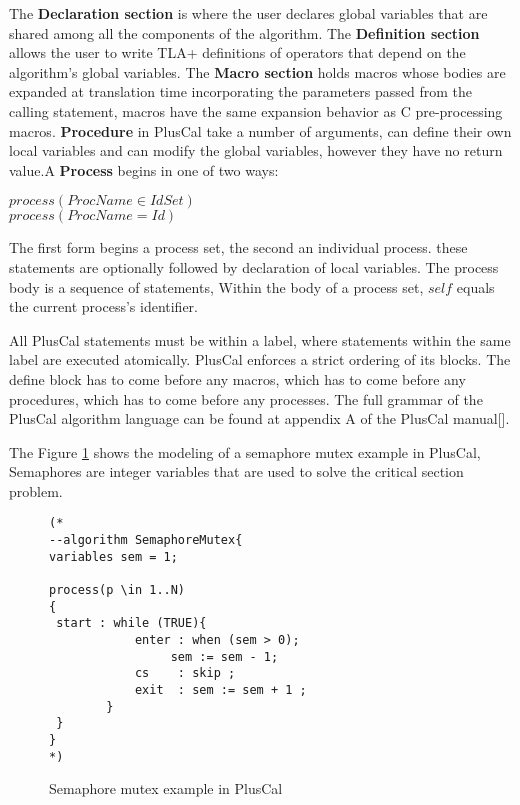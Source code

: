 \documentclass{thesul}
\begin{document}
The \textbf{Declaration section} is where the user declares global variables that are shared among all the components of the algorithm. The \textbf{Definition section} allows the user to write TLA+ definitions of operators that depend on the algorithm's global variables.
The \textbf{Macro section} holds macros whose bodies are expanded at translation time incorporating the parameters passed from the calling statement, macros have the same expansion behavior as C pre-processing macros. \textbf{Procedure} in PlusCal take a number of arguments, can define their own local variables and can modify the global variables, however they have no return value.A \textbf{Process} begins in one of two ways: 
\begin{center}
$process (ProcName \in IdSet)$ \\
$process (ProcName = Id)$

\end{center}

The first form begins a process set, the second an individual process. these statements are optionally followed by declaration of local variables. The process body is a sequence of statements, Within the body of a process set, $self$ equals the current process's identifier.

All PlusCal statements must be within a label, where statements within the same label are executed atomically.
PlusCal enforces a strict ordering of its blocks. The define block has to come before any macros, which has to come before any procedures, which has to come before any processes. The full grammar of the PlusCal algorithm language can be found at appendix A of the PlusCal manual[\cite{pcalAlgo}].

The Figure \ref{semaphoreEx} shows the modeling of a semaphore mutex example in PlusCal, Semaphores are integer variables that are used to solve the critical section problem.
 
\begin{figure}[!h]

\begin{lstlisting}[frame = tlrb, firstnumber = 1]
(*
--algorithm SemaphoreMutex{
variables sem = 1;

process(p \in 1..N)
{
 start : while (TRUE){
            enter : when (sem > 0);
                 sem := sem - 1;            
            cs    : skip ;
            exit  : sem := sem + 1 ;
        }
 }
}
*)

\end{lstlisting}
\caption{Semaphore mutex example in PlusCal}
\label{semaphoreEx}
\end{figure} 
\hfill\\
\end{document}
